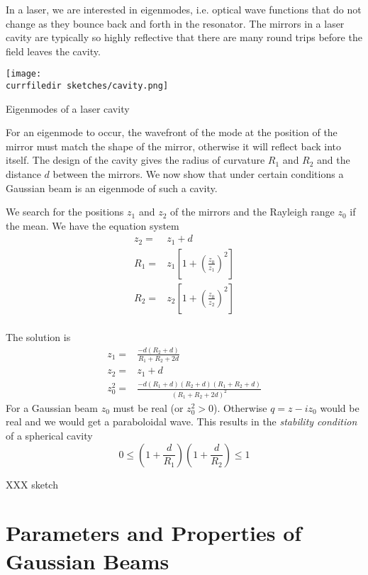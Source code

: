 In a laser, we are interested in eigenmodes, i.e. optical wave functions that do not change as they bounce back and forth in the resonator. The mirrors in a laser cavity are typically so highly reflective that there are many round trips before the field leaves the cavity.


\begin{marginfigure}
    \texttt{[image: \\currfiledir sketches/cavity.png]}
   \caption{Eigenmodes of a laser cavity}
\end{marginfigure}


For an eigenmode to occur, the wavefront of the mode at the position of the mirror must match the shape of the mirror, otherwise it will reflect back into itself. The design of the cavity gives the radius of curvature $R_1$ and $R_2$ and the distance $d$ between the mirrors. We now show that under certain conditions a Gaussian beam is an eigenmode of such a cavity.

We search for the positions $z_1$ and $z_2$ of the mirrors and the Rayleigh range $z_0$ if the mean. We have the equation system
\begin{align}
    z_2 = & z_1 + d \\
    R_1 = & z_1 \left[ 1 + \left( \frac{z_0}{z_1} \right)^2 \right] \\
    R_2 = & z_2 \left[ 1 + \left( \frac{z_0}{z_2} \right)^2 \right] \\
\end{align}

The solution is
\begin{align}
    z_1 = & \frac{-d (R_2 + d)}{R_1 + R_2 + 2d} \\
    z_2 = &z_1 + d  \\
    z_0^2 = & \frac{-d (R_1 +d)(R_2 + d)(R_1 + R_2 +d)}{(R_1 + R_2 + 2d)^2}
\end{align}
For a Gaussian beam $z_0$ must be real (or $z_0^2 > 0$). Otherwise $q = z - i z_0$ would be real and we would get a paraboloidal wave. This results in the \emph{stability condition} of a spherical cavity
\begin{equation}
    0 \le \left( 1 + \frac{d}{R_1} \right) \left( 1 + \frac{d}{R_2} \right) \le 1
\end{equation}

XXX sketch

\section{Parameters and Properties of Gaussian Beams}

